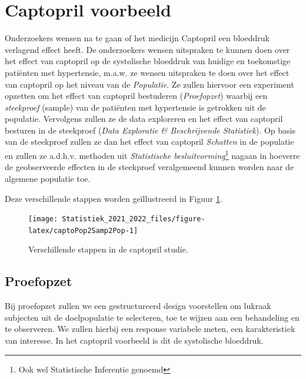\documentclass[
  12pt,dutch,coursenotes]{book}
\theoremstyle{definition}
\theoremstyle{definition}
\theoremstyle{definition}
\theoremstyle{definition}
\theoremstyle{remark}
\begin{document}
\hypertarget{captopril-voorbeeld}{%
\section{Captopril voorbeeld}\label{captopril-voorbeeld}}

Onderzoekers wensen na te gaan of het medicijn Captopril een bloeddruk verlagend effect heeft.
De onderzoekers wensen uitspraken te kunnen doen over het effect van captopril op de systolische bloeddruk van huidige en toekomstige patiënten met hypertensie, m.a.w. ze wensen uitspraken te doen over het effect van captopril op het niveau van de \emph{Populatie}.
Ze zullen hiervoor een experiment opzetten om het effect van captopril bestuderen (\emph{Proefopzet}) waarbij een \emph{steekproef} (sample) van de patiënten met hypertensie is getrokken uit de populatie.
Vervolgens zullen ze de data exploreren en het effect van captopril besturen in de steekproef (\emph{Data Exploratie \& Beschrijvende Statistiek}). Op basis van de steekproef zullen ze dan het effect van captopril \emph{Schatten} in de populatie en zullen ze a.d.h.v. methoden uit \emph{Statistische besluitvorming}\footnote{Ook wel Statistische Inferentie genoemd} nagaan in hoeverre de geobserveerde effecten in de steekproef veralgemeend kunnen worden naar de algemene populatie toe.

Deze verschillende stappen worden geïllustreerd in Figuur \ref{fig:captoPop2Samp2Pop}.

\begin{figure}

{\centering \texttt{[image: Statistiek\_2021\_2022\_files/figure-latex/captoPop2Samp2Pop-1]} 

}

\caption{Verschillende stappen in de captopril studie.}\label{fig:captoPop2Samp2Pop}
\end{figure}

\hypertarget{proefopzet}{%
\subsection{Proefopzet}\label{proefopzet}}

Bij proefopzet zullen we een gestructureerd design voorstellen om lukraak subjecten uit de doelpopulatie
te selecteren, toe te wijzen aan een behandeling en te observeren.
We zullen hierbij een response variabele meten, een karakteristiek van interesse. In het captopril voorbeeld is dit de systolische bloeddruk.
\end{document}

